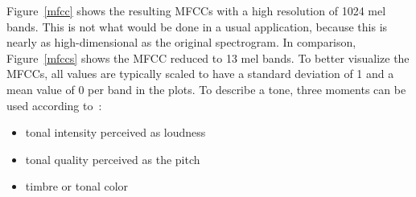 \FloatBarrier
\noindent Figure~\ref{mfcc} shows the resulting MFCCs with a high resolution of 1024 mel bands. This is not what would be done in a usual application, because this is nearly as high-dimensional as the original spectrogram. In comparison, Figure~\ref{mfccs} shows the MFCC reduced to 13 mel bands.
To better visualize the MFCCs, all values are typically scaled to have a standard deviation of 1 and a mean value of 0 per band in the plots. 
\noindent To describe a tone, three moments can be used according to~\cite[pp. 15f]{musicdata}: %
\begin{itemize}
	\setlength\itemsep{-0.5em}
	\item tonal intensity perceived as loudness
	\item tonal quality perceived as the pitch 
	\item timbre or tonal color
\end{itemize}

